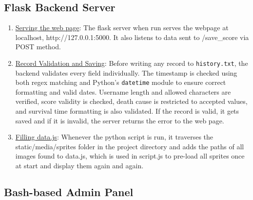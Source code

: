 \documentclass[12pt]{article}
\begin{document}
\subsection{Flask Backend Server}
\begin{enumerate}
    \item \underline{Serving the web page}:
    The flask server when run serves the webpage at localhost, http://127.0.0.1:5000. It also listens to data sent to /save\_score via POST method.

    \item \underline{Record Validation and Saving}:
    Before writing any record to \texttt{history.txt}, the backend validates every field individually. The timestamp is checked using both regex matching and Python's \texttt{datetime} module to ensure correct formatting and valid dates. Username length and allowed characters are verified, score validity is checked, death cause is restricted to accepted values, and survival time formatting is also validated. If the record is valid, it gets saved and if it is invalid, the server returns the error to the web page.

    \item \underline{Filling data.js}: 
    Whenever the python script is run, it traverses the static/media/sprites folder in the project directory and adds the paths of all images found to data.js, which is used in script.js to pre-load all sprites once at start and display them again and again.
\end{enumerate}

\subsection{Bash-based Admin Panel}
\end{document}
